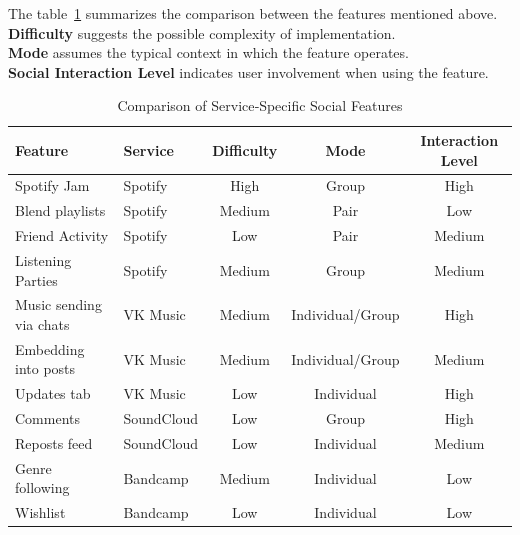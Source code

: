 The table~\ref{tab:social_features} summarizes the comparison between the features mentioned above.\\
\textbf{Difficulty} suggests the possible complexity of implementation.\\
\textbf{Mode} assumes the typical context in which the feature operates.\\
\textbf{Social Interaction Level} indicates user involvement when using the feature.\\


\begin{table}[ht]
    \caption{Comparison of Service‐Specific Social Features}
    \label{tab:social_features}
    \begin{tabular}{|l|l|c|c|c|}
        \hline
        \textbf{Feature}        & \textbf{Service} & \textbf{Difficulty} & \textbf{Mode}    & \textbf{Interaction Level} \\
        \hline\hline
        Spotify Jam             & Spotify          & High                & Group            & High                       \\
        \hline
        Blend playlists         & Spotify          & Medium              & Pair             & Low                        \\
        \hline
        Friend Activity         & Spotify          & Low                 & Pair             & Medium                     \\
        \hline
        Listening Parties       & Spotify          & Medium              & Group            & Medium                     \\
        \hline
        Music sending via chats & VK Music         & Medium              & Individual/Group & High                       \\
        \hline
        Embedding into posts    & VK Music         & Medium              & Individual/Group & Medium                     \\
        \hline
        Updates tab             & VK Music         & Low                 & Individual       & High                       \\
        \hline
        Comments                & SoundCloud       & Low                 & Group            & High                       \\
        \hline
        Reposts feed            & SoundCloud       & Low                 & Individual       & Medium                     \\
        \hline
        Genre following         & Bandcamp         & Medium              & Individual       & Low                        \\
        \hline
        Wishlist                & Bandcamp         & Low                 & Individual       & Low                        \\
        \hline
    \end{tabular}
\end{table}


